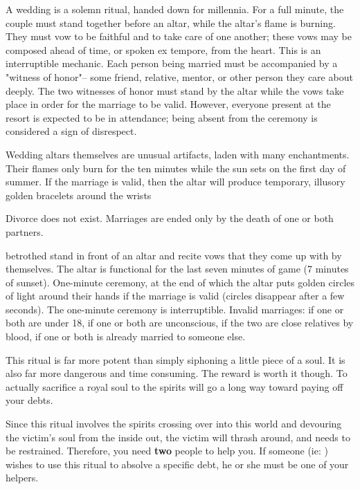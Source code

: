 \documentclass[green]{Kos}
\begin{document}
\name{\gWedding{}}

A wedding is a solemn ritual, handed down for millennia. For a full minute, the couple must stand together before an altar, while the altar's flame is burning. They must vow to be faithful and to take care of one another; these vows may be composed ahead of time, or spoken ex tempore, from the heart. This is an interruptible mechanic. Each person being married must be accompanied by a "witness of honor"-- some friend, relative, mentor, or other person they care about deeply. The two witnesses of honor must stand by the altar while the vows take place in order for the marriage to be valid. However, everyone present at the resort is expected to be in attendance; being absent from the ceremony is considered a sign of disrespect.

Wedding altars themselves are unusual artifacts, laden with many enchantments. Their flames only burn for the ten minutes while the sun sets on the first day of summer. If the marriage is valid, then the altar will produce temporary, illusory golden bracelets around the wrists


Divorce does not exist. Marriages are ended only by the death of one or both partners.

 betrothed stand in front of an altar and recite vows that they come up with by themselves. The altar is functional for the last seven minutes of game (7 minutes of sunset). One-minute ceremony, at the end of which the altar puts golden circles of light around their hands if the marriage is valid (circles disappear after a few seconds). The one-minute ceremony is interruptible. Invalid marriages: if one or both are under 18, if one or both are unconscious, if the two are close relatives by blood, if one or both is already married to someone else.

This ritual is far more potent than simply siphoning a little piece of a soul. It is also far more dangerous and time consuming. The reward is worth it though. To actually sacrifice a royal soul to the spirits will go a long way toward paying off your debts.

Since this ritual involves the spirits crossing over into this world and devouring the victim's soul from the inside out, the victim will thrash around, and needs to be restrained. Therefore, you need {\bf two} people to help you. If someone (ie: \cAriel{}) wishes to use this ritual to absolve a specific debt, he or she must be one of your helpers.
\end{document}
